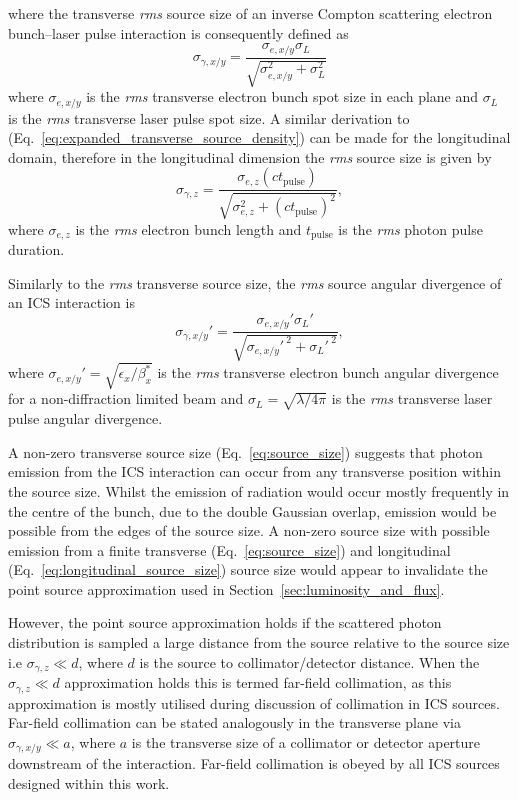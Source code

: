 \documentclass[../main.tex]{subfiles}
\begin{document}
where the transverse \textit{rms} source size of an inverse Compton scattering electron bunch--laser pulse interaction is consequently defined as
\begin{equation}
\sigma_{\gamma,x/y} = \frac{\sigma_{e,x/y}\sigma_{L}}{\sqrt{\sigma_{e,x/y}^{2}+\sigma_{L}^{2}}}
\label{eq:source_size}
\end{equation}
where $\sigma_{e,x/y}$ is the \textit{rms} transverse electron bunch spot size in each plane and $\sigma_{L}$ is the \textit{rms} transverse laser pulse spot size. A similar derivation to (Eq.~\ref{eq:expanded_transverse_source_density}) can be made for the longitudinal domain, therefore in the longitudinal dimension the \textit{rms} source size is given by
\begin{equation}
\sigma_{\gamma,z} = \frac{\sigma_{e,z}\left(ct_{\mathrm{pulse}}\right)}{\sqrt{\sigma_{e,z}^{2}+\left(ct_{\mathrm{pulse}}\right)^{2}}},
\label{eq:longitudinal_source_size}
\end{equation}
where $\sigma_{e,z}$ is the \textit{rms} electron bunch length and $t_{\mathrm{pulse}}$ is the \textit{rms} photon pulse duration. 

Similarly to the \textit{rms} transverse source size, the \textit{rms} source angular divergence of an ICS interaction is
\begin{equation}
\sigma_{\gamma,x/y}' = \frac{\sigma_{e,x/y}'\sigma_{L}'}{\sqrt{\sigma_{e,x/y}'^{~2}+\sigma_{L}'^{~2}}},
\label{eq:source_divergence}
\end{equation}
where $\sigma_{e,x/y}' = \sqrt{\epsilon_{x}/\beta_{x}^{*}}$ is the \textit{rms} transverse electron bunch angular divergence for a non-diffraction limited beam and $\sigma_{L} = \sqrt{\lambda/4\pi}$ is the \textit{rms} transverse laser pulse angular divergence.

A non-zero transverse source size (Eq.~\ref{eq:source_size}) suggests that photon emission from the ICS interaction can occur from any transverse position within the source size. Whilst the emission of radiation would occur mostly frequently in the centre of the bunch, due to the double Gaussian overlap, emission would be possible from the edges of the source size. A non-zero source size with possible emission from a finite transverse (Eq.~\ref{eq:source_size}) and longitudinal (Eq.~\ref{eq:longitudinal_source_size}) source size would appear to invalidate the point source approximation used in Section~\ref{sec:luminosity_and_flux}.

However, the point source approximation holds if the scattered photon distribution is sampled a large distance from the source relative to the source size i.e $\sigma_{\gamma,z} \ll d$, where $d$ is the source to collimator/detector distance. When the $\sigma_{\gamma,z} \ll d$ approximation holds this is termed far-field collimation, as this approximation is mostly utilised during discussion of collimation in ICS sources. Far-field collimation can be stated analogously in the transverse plane via $\sigma_{\gamma,x/y} \ll a$, where $a$ is the transverse size of a collimator or detector aperture downstream of the interaction. Far-field collimation is obeyed by all ICS sources designed within this work.  
\end{document}
